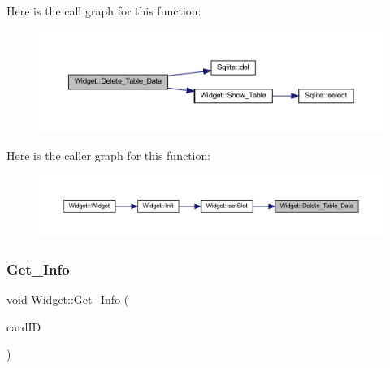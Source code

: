 Here is the call graph for this function\+:
\nopagebreak
\begin{figure}[H]
\begin{center}
\leavevmode
\includegraphics[width=350pt]{class_widget_a0e7b4792c1f760b129a08ac63107a018_cgraph}
\end{center}
\end{figure}
Here is the caller graph for this function\+:
\nopagebreak
\begin{figure}[H]
\begin{center}
\leavevmode
\includegraphics[width=350pt]{class_widget_a0e7b4792c1f760b129a08ac63107a018_icgraph}
\end{center}
\end{figure}
\mbox{\label{class_widget_a25fcbea5c404362947c24794373a0968}} 
\subsubsection{\texorpdfstring{Get\_Info}{Get\_Info}}
{\footnotesize\ttfamily void Widget\+::\+Get\+\_\+\+Info (\begin{DoxyParamCaption}\item[{Q\+String}]{card\+ID }\end{DoxyParamCaption})\hspace{0.3cm}{\ttfamily [slot]}}

